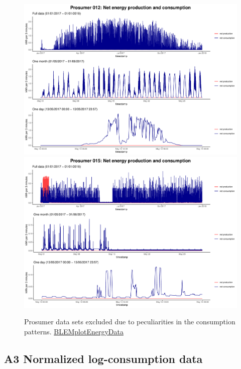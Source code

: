 \begin{centering}
\begin{figure}[H]
        \includegraphics[width=\textwidth-0.85cm]{thesis/graphs/timeseries/p012_prod&cons.pdf}\vspace{0.3cm}
        \includegraphics[width=\textwidth-0.85cm]{thesis/graphs/timeseries/p015_prod&cons.pdf}
        \caption[Prosumer data sets excluded due to peculiarities in the consumption patterns]{Prosumer data sets excluded due to peculiarities in the consumption patterns. \quantnet\href{https://github.com/QuantLet/BLEM/tree/master/BLEMplotEnergyData}{BLEMplotEnergyData}}
\end{figure}
\end{centering}


\subsection*{\hypertarget{AppA3:Figures:transform}{A3} Normalized log-consumption data}\label{AppA3:Figures:transform}

